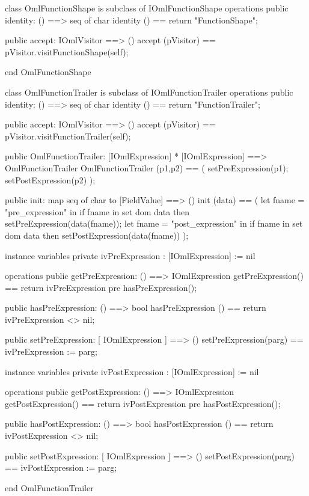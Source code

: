 \begin{vdm_al}
class OmlFunctionShape is subclass of IOmlFunctionShape
operations
  public identity: () ==> seq of char
  identity () == return "FunctionShape";

  public accept: IOmlVisitor ==> ()
  accept (pVisitor) == pVisitor.visitFunctionShape(self);

end OmlFunctionShape
\end{vdm_al}
\begin{vdm_al}
class OmlFunctionTrailer is subclass of IOmlFunctionTrailer
operations
  public identity: () ==> seq of char
  identity () == return "FunctionTrailer";

  public accept: IOmlVisitor ==> ()
  accept (pVisitor) == pVisitor.visitFunctionTrailer(self);

  public OmlFunctionTrailer:
      [IOmlExpression] *
      [IOmlExpression] ==> OmlFunctionTrailer
  OmlFunctionTrailer (p1,p2) == 
   ( setPreExpression(p1);
     setPostExpression(p2) );

  public init: map seq of char to [FieldValue] ==> ()
  init (data) ==
    ( let fname = "pre_expression" in
        if fname in set dom data
        then setPreExpression(data(fname));
      let fname = "post_expression" in
        if fname in set dom data
        then setPostExpression(data(fname)) );

instance variables
  private ivPreExpression : [IOmlExpression] := nil

operations
  public getPreExpression: () ==> IOmlExpression
  getPreExpression() == return ivPreExpression
    pre hasPreExpression();

  public hasPreExpression: () ==> bool
  hasPreExpression () == return ivPreExpression <> nil;

  public setPreExpression: [ IOmlExpression ] ==> ()
  setPreExpression(parg) == ivPreExpression := parg;

instance variables
  private ivPostExpression : [IOmlExpression] := nil

operations
  public getPostExpression: () ==> IOmlExpression
  getPostExpression() == return ivPostExpression
    pre hasPostExpression();

  public hasPostExpression: () ==> bool
  hasPostExpression () == return ivPostExpression <> nil;

  public setPostExpression: [ IOmlExpression ] ==> ()
  setPostExpression(parg) == ivPostExpression := parg;

end OmlFunctionTrailer
\end{vdm_al}

